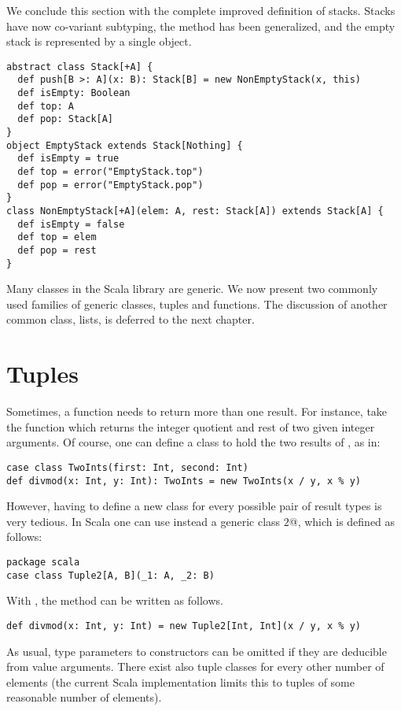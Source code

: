 We conclude this section with the complete improved definition of
stacks. Stacks have now co-variant subtyping, the  method
has been generalized, and the empty stack is represented by a single
object.
\begin{lstlisting}
abstract class Stack[+A] {
  def push[B >: A](x: B): Stack[B] = new NonEmptyStack(x, this)
  def isEmpty: Boolean
  def top: A
  def pop: Stack[A]
}
object EmptyStack extends Stack[Nothing] {
  def isEmpty = true
  def top = error("EmptyStack.top")
  def pop = error("EmptyStack.pop")
}
class NonEmptyStack[+A](elem: A, rest: Stack[A]) extends Stack[A] {
  def isEmpty = false
  def top = elem
  def pop = rest
}
\end{lstlisting}
Many classes in the Scala library are generic. We now present two
commonly used families of generic classes, tuples and functions. The
discussion of another common class, lists, is deferred to the next
chapter.

\section{Tuples}

Sometimes, a function needs to return more than one result. For
instance, take the function  which returns the integer quotient
and rest of two given integer arguments.  Of course, one can define a
class to hold the two results of , as in:
\begin{lstlisting}
case class TwoInts(first: Int, second: Int)
def divmod(x: Int, y: Int): TwoInts = new TwoInts(x / y, x % y)
\end{lstlisting}
However, having to define a new class for every possible pair of
result types is very tedious. In Scala one can use instead a
generic class \lstinline@Tuple$2$@, which is defined as follows:
\begin{lstlisting}
package scala
case class Tuple2[A, B](_1: A, _2: B)
\end{lstlisting}
With , the  method can be written as follows.
\begin{lstlisting}
def divmod(x: Int, y: Int) = new Tuple2[Int, Int](x / y, x % y)
\end{lstlisting}
As usual, type parameters to constructors can be omitted if they are
deducible from value arguments. There exist also tuple classes for
every other number of elements (the current Scala implementation
limits this to tuples of some reasonable number of elements).  

